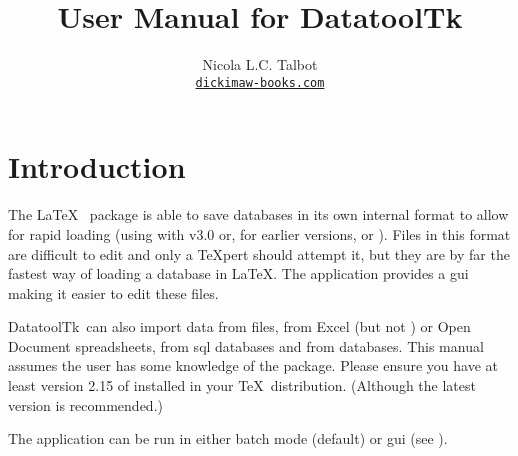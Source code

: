 
\usepackage{fontspec}
\setmainfont{Linux Libertine O}
\usepackage{verbatim}
\usepackage
 [
 ]{texjavahelp}

\hypersetup{colorlinks,linkcolor=blue}

\newcommand{\appname}{DatatoolTk}

\title{User Manual for \appname}
\author{Nicola L.C. Talbot\\\href{https://www.dickimaw-books.com/}{\nolinkurl{dickimaw-books.com}}}


\GlsXtrLoadResources[src={datatooltk},
 \TeXJavaHelpSymbolResourceOptions
]

\GlsXtrLoadResources[src={datatooltk,\langbibsrcs},
 \TeXJavaHelpGlsResourceOptions,
 match-action=add,match={category=menu}
]


\maketitle
\tableofcontents
\listoffigures

\chapter{Introduction}
\label{introduction}

The \LaTeX\  package is able to save databases in its
own internal format to allow for rapid loading (using
 with
 v3.0 or, for earlier versions,
 or
).  Files in this
 format are difficult to edit and only a \TeX pert should
attempt it, but they are by far the fastest way of loading a
 \gls{database} in \LaTeX. The 
application provides a \gls{gui} making it easier to edit these
files. 

\appname\ can also import data from  files, from
Excel  (but not )
or Open Document  spreadsheets, from 
\gls{sql} databases and from  databases.
This manual assumes the user has some knowledge of the
 package. Please ensure you have at least version
2.15 of  installed in your \TeX\ distribution.
(Although the latest version is recommended.)

The  application can be run in either 
batch mode (default) or \gls{gui} (see ).

